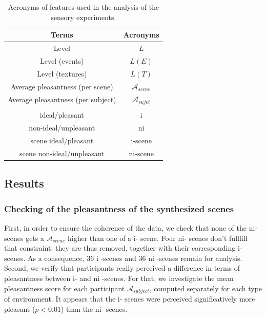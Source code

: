 \documentclass[twoside,twocolumn]{article}
\begin{document}
\begin{table}[t]
\centering
\begin{tabular}{c c}
Terms                         & Acronyms              \\
\hline
Level                        & $L$                    \\
Level (events)            & $L(E)$                 \\
Level (textures)              & $L(T)$                 \\
Average pleasantness (per scene)     & $\mathcal{A}_{scene}$  \\
Average pleasantness (per subject)     & $\mathcal{A}_{sujet}$  \\
                               &                        \\
ideal/pleasant                & i                      \\
non-ideal/unpleasant         & ni                     \\
scene ideal/pleasant          & i-scene                \\
scene non-ideal/unpleasant   & ni-scene               \\
\hline
\end{tabular}
\vspace{0.5mm}
\caption{Acronyms of features used in the analysis of the sensory experiments.}
\label{tab:acronyme}
\end{table}

\subsection{Results}

\subsubsection*{Checking of the pleasantness of the synthesized scenes}

First, in order to ensure the coherence of the data, we check that none of the ni- scenes gets a $\mathcal{A}_{scene}$ higher than one of a i- scene. Four ni- scenes don’t fullfill that constraint: they are thus removed, together with their corresponding i- scenes. As a consequence, 36 i -scenes and 36 ni -scenes remain for analysis. Second, we verify that participants really perceived a difference in terms of pleasantness between i- and ni -scenes. For that, we investigate the mean pleasantness score for each participant $\mathcal{A}_{subject}$, computed separately for each type of environment. It appears that the i- scenes were perceived significatively more pleasant ($p < 0.01$) than the ni- scenes.
\end{document}
